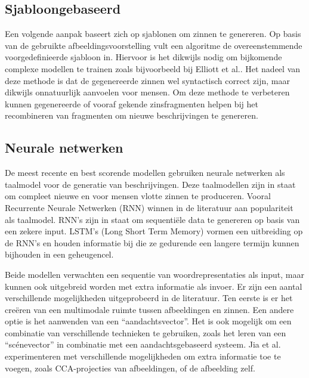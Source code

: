 \subsection{Sjabloongebaseerd}
Een volgende aanpak baseert zich op sjablonen om zinnen te genereren. Op basis van de gebruikte afbeeldingsvoorstelling vult een algoritme de overeenstemmende voorgedefinieerde sjabloon in\cite{Yang2011}. Hiervoor is het dikwijls nodig om bijkomende complexe modellen te trainen zoals bijvoorbeeld bij Elliott et al.\cite{Elliott2013}. Het nadeel van deze methode is dat de gegenereerde zinnen wel syntactisch correct zijn, maar dikwijls onnatuurlijk aanvoelen voor mensen. Om deze methode te verbeteren kunnen gegenereerde of vooraf gekende zinsfragmenten helpen bij het recombineren van fragmenten om nieuwe beschrijvingen te genereren\cite{Mitchell2012,Kuznetsova2012}. 

\subsection{Neurale netwerken}
De meest recente en best scorende modellen gebruiken neurale netwerken als taalmodel voor de generatie van beschrijvingen. Deze taalmodellen zijn in staat om compleet nieuwe en voor mensen vlotte zinnen te produceren. Vooral Recurrente Neurale Netwerken (RNN)\cite{Mikolov2010} winnen in de literatuur aan populariteit als taalmodel. RNN's zijn in staat om sequenti\"ele data te genereren op basis van een zekere input. LSTM's (Long Short Term Memory)\cite{SeppHochreiter1997} vormen een uitbreiding op de RNN's en houden informatie bij die ze gedurende een langere termijn kunnen bijhouden in een geheugencel. 

Beide modellen verwachten een sequentie van woordrepresentaties als input, maar kunnen ook uitgebreid worden met extra informatie als invoer. Er zijn een aantal verschillende mogelijkheden uitgeprobeerd in de literatuur. Ten eerste is er het cre\"eren van een multimodale ruimte tussen afbeeldingen en zinnen\cite{Kiros2014,Socher2014}. Een andere optie is het aanwenden van een ``aandachtsvector''\cite{Xu2015}. Het is ook mogelijk om een combinatie van verschillende technieken te gebruiken, zoals het leren van een ``sc\'enevector'' in combinatie met een aandachtsgebaseerd systeem\cite{Jin2015}. Jia et al. experimenteren met verschillende mogelijkheden om extra informatie toe te voegen, zoals CCA-projecties van afbeeldingen, of de afbeelding zelf\cite{Fernando2015}.

